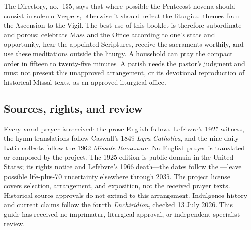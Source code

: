 The Directory, no.~155, says that where possible the Pentecost novena should consist in solemn Vespers; otherwise it should reflect the liturgical themes from the Ascension to the Vigil. The best use of this booklet is therefore subordinate and porous: celebrate Mass and the Office according to one's state and opportunity, hear the appointed Scriptures, receive the sacraments worthily, and use these meditations outside the liturgy. A household can pray the compact order in fifteen to twenty-five minutes. A parish needs the pastor's judgment and must not present this unapproved arrangement, or its devotional reproduction of historical Missal texts, as an approved liturgical office.

\subsection{Sources, rights, and review}

Every vocal prayer is received: the prose English follows Lefebvre's 1925 witness, the hymn translations follow Caswall's 1849 \textit{Lyra Catholica}, and the nine daily Latin collects follow the 1962 \textit{Missale Romanum}. No English prayer is translated or composed by the project. The 1925 edition is public domain in the United States; its rights notice and Lefebvre's 1966 death---the dates follow the ---leave possible life-plus-70 uncertainty elsewhere through 2036. The project license covers selection, arrangement, and exposition, not the received prayer texts. Historical source approvals do not extend to this arrangement. Indulgence history and current claims follow the fourth \textit{Enchiridion}, checked 13 July 2026. This guide has received no imprimatur, liturgical approval, or independent specialist review.
